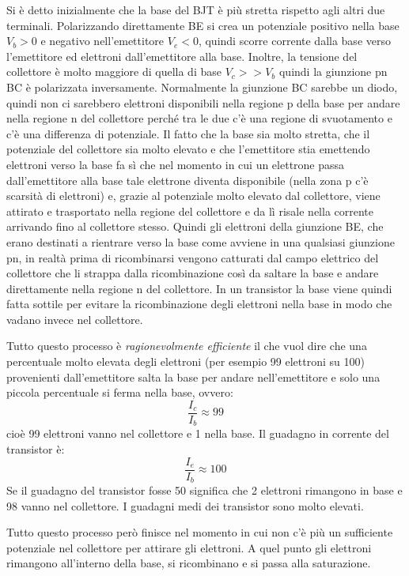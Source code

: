\documentclass[12pt, a4paper]{report}
\begin{document}
Si è detto inizialmente che la base del BJT è più stretta rispetto agli altri due terminali. Polarizzando direttamente BE si crea un potenziale positivo nella base $V_{b} > 0$ e negativo nell'emettitore $V_{e} < 0$, quindi scorre corrente dalla base verso l'emettitore ed elettroni dall'emettitore alla base. Inoltre, la tensione del collettore è molto maggiore di quella di base $V_{c} >> V_{b}$ quindi la giunzione pn BC è polarizzata inversamente. Normalmente la giunzione BC sarebbe un diodo, quindi non ci sarebbero elettroni disponibili nella regione p della base per andare nella regione n del collettore perché tra le due c'è una regione di svuotamento e c'è una differenza di potenziale. Il fatto che la base sia molto stretta, che il potenziale del collettore sia molto elevato e che l'emettitore stia emettendo elettroni verso la base fa sì che nel momento in cui un elettrone passa dall'emettitore alla base tale elettrone diventa disponibile (nella zona p c'è scarsità di elettroni) e, grazie al potenziale molto elevato dal collettore, viene attirato e trasportato nella regione del collettore e da lì risale nella corrente arrivando fino al collettore stesso. Quindi gli elettroni della giunzione BE, che erano destinati a rientrare verso la base come avviene in una qualsiasi giunzione pn, in realtà prima di ricombinarsi vengono catturati dal campo elettrico del collettore che li strappa dalla ricombinazione così da saltare la base e andare direttamente nella regione n del collettore. In un transistor la base viene quindi fatta sottile per evitare la ricombinazione degli elettroni nella base in modo che vadano invece nel collettore.

Tutto questo processo è \textit{ragionevolmente efficiente} il che vuol dire che una percentuale molto elevata degli elettroni (per esempio 99 elettroni su 100) provenienti dall'emettitore salta la base per andare nell'emettitore e solo una piccola percentuale si ferma nella base, ovvero:
\begin{equation*}
    \frac{I_{c}}{I_{b}} \approx 99
\end{equation*}
cioè 99 elettroni vanno nel collettore e 1 nella base. Il guadagno in corrente del transistor è:
\begin{equation*}
    \frac{I_{e}}{I_{b}} \approx 100
\end{equation*}
Se il guadagno del transistor fosse 50 significa che 2 elettroni rimangono in base e 98 vanno nel collettore. I guadagni medi dei transistor sono molto elevati.

Tutto questo processo però finisce nel momento in cui non c'è più un sufficiente potenziale nel collettore per attirare gli elettroni. A quel punto gli elettroni rimangono all'interno della base, si ricombinano e si passa alla saturazione. 
\end{document}
